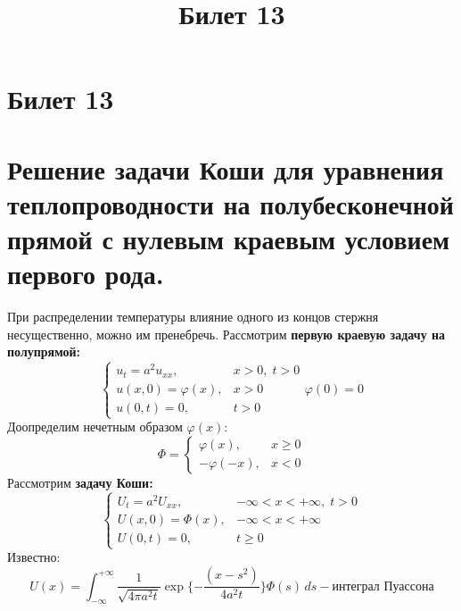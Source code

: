\documentclass[11pt,a4paper]{article}
\title{Билет 13}
\date{}
\begin{document}
\section*{Билет 13}
\section{Решение задачи Коши для уравнения теплопроводности на полубесконечной прямой с нулевым краевым условием первого рода.}

    \noindent
    При распределении температуры влияние одного из концов стержня несущественно, можно им пренебречь. 
    Рассмотрим \textbf{первую краевую задачу на полупрямой:} 
        \begin{equation}\label{eq1}
            \begin{cases}
                u_t = a^2u_{xx}, & x > 0,\;t > 0 \\ 
                u(x,0) = \varphi(x), & x > 0 \\
                u(0,t) = 0, & t > 0
            \end{cases} 
                \varphi(0) = 0
        \end{equation}
    Доопределим нечетным образом \(\varphi(x)\):
        \begin{equation}\label{eq2}
            \Phi = \begin{cases}
                        \varphi(x), & x \ge 0 \\
                        -\varphi(-x), & x < 0
                    \end{cases}
        \end{equation}
    Рассмотрим \textbf{задачу Коши:}
        \begin{equation}\label{eq3}
            \begin{cases}
                U_t = a^2U_{xx}, & -\infty < x < +\infty,\;t > 0 \\ 
                U(x,0) = \Phi(x), & -\infty < x < +\infty \\
                U(0,t) = 0, & t \ge 0
            \end{cases}
        \end{equation}
    Известно: 
        \begin{equation}\label{eq4}
            U(x) =  \int_{-\infty}^{+\infty}\frac{1}{\sqrt{4\pi a^2 t}} \exp\{{-\frac{(x-s^2)}{4a^2t}}\}\Phi(s)\,ds - \textit{интеграл Пуассона}  
        \end{equation}
\end{document}
